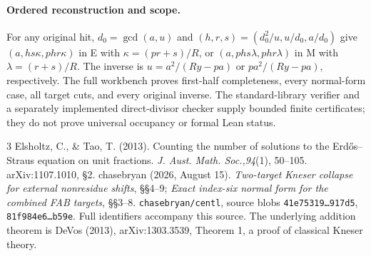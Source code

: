 \documentclass[10pt,a4paper]{article}
\begin{document}
\paragraph{Ordered reconstruction and scope.}
For any original hit, $d_0=\gcd(a,u)$ and
$(h,r,s)=(d_0^2/u,u/d_0,a/d_0)$ give $(a,hs\kappa,phr\kappa)$ in E with
$\kappa=(pr+s)/R$, or $(a,phs\lambda,phr\lambda)$ in M with
$\lambda=(r+s)/R$. The inverse is $u=a^2/(Ry-pa)$ or $pa^2/(Ry-pa)$,
respectively. The full workbench proves first-half completeness, every
normal-form case, all target cuts, and every original inverse. The standard-library
verifier and a separately implemented direct-divisor checker supply bounded
finite certificates; they do not prove universal occupancy or formal Lean status.

\begingroup\small
\begin{thebibliography}{3}
 Elsholtz, C., \& Tao, T. (2013). Counting the number of solutions to
the Erd\H{o}s--Straus equation on unit fractions. \emph{J. Aust. Math. Soc.,94}(1),
50--105. arXiv:1107.1010, \S2.
 chasebryan (2026, August 15). \emph{Two-target Kneser collapse
for external nonresidue shifts}, \S\S4--9; \emph{Exact index-six normal form
for the combined FAB targets}, \S\S3--8. \texttt{chasebryan/centl}, source blobs
\texttt{41e75319\ldots917d5}, \texttt{81f984e6\ldots{}b59e}. Full identifiers accompany
this source. The underlying addition theorem is DeVos (2013), arXiv:1303.3539,
Theorem 1, a proof of classical Kneser theory.
\end{thebibliography}
\endgroup
\end{document}
